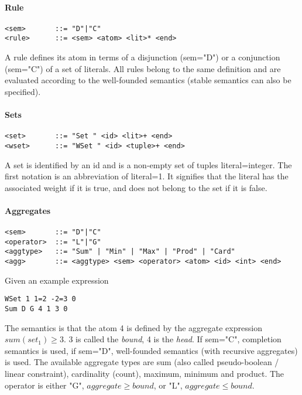 \documentclass{article}
\begin{document}
\paragraph{Rule}
\begin{verbatim}
<sem>       ::= "D"|"C"
<rule>      ::= <sem> <atom> <lit>* <end>
\end{verbatim} 
A rule defines its atom in terms of a disjunction (sem="D") or a conjunction (sem="C") of a set of literals. All rules belong to the same definition and are evaluated according to the well-founded semantics (stable semantics can also be specified).

\paragraph{Sets}
\begin{verbatim}
<set>       ::= "Set " <id> <lit>+ <end>
<wset>      ::= "WSet " <id> <tuple>+ <end>
\end{verbatim} 
A set is identified by an id and is a non-empty set of tuples literal=integer. The first notation is an abbreviation of literal=1. It signifies that the literal has the associated weight if it is true, and does not belong to the set if it is false.

\paragraph{Aggregates}
\begin{verbatim}
<sem>       ::= "D"|"C"
<operator>  ::= "L"|"G"
<aggtype>   ::= "Sum" | "Min" | "Max" | "Prod" | "Card"
<agg>       ::= <aggtype> <sem> <operator> <atom> <id> <int> <end>
\end{verbatim} 
Given an example expression
\begin{verbatim}
WSet 1 1=2 -2=3 0
Sum D G 4 1 3 0
\end{verbatim}
The semantics is that the atom 4 is defined by the aggregate expression $sum(set_1) \geq 3$. 3 is called the \emph{bound}, 4 is the \emph{head}. If sem="C", completion semantics is used, if sem="D", well-founded semantics (with recursive aggregates) is used.
The available aggregate types are sum (also called pseudo-boolean / linear constraint), cardinality (count), maximum, minimum and product. The operator is either "G", $aggregate \geq bound$, or "L", $aggregate \leq bound$.
 
\end{document}
